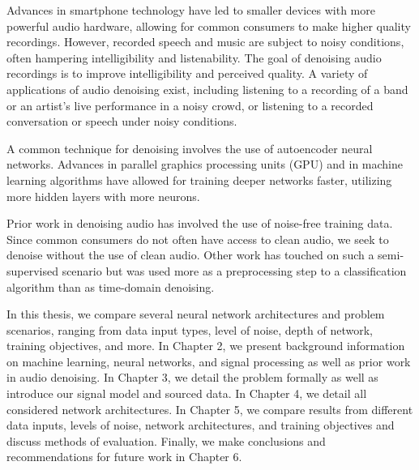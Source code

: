 Advances in smartphone technology have led to smaller devices with more powerful audio hardware, allowing for common consumers to make higher quality recordings. However, recorded speech and music are subject to noisy conditions, often hampering intelligibility and listenability. The goal of denoising audio recordings is to improve intelligibility and perceived quality. A variety of applications of audio denoising exist, including listening to a recording of a band or an artist's live performance in a noisy crowd, or listening to a recorded conversation or speech under noisy conditions.

A common technique for denoising involves the use of autoencoder neural networks. \cite{liu2014experiments} Advances in parallel graphics processing units (GPU) and in machine learning algorithms have allowed for training deeper networks faster, utilizing more hidden layers with more neurons.

Prior work in denoising audio has involved the use of noise-free training data. Since common consumers do not often have access to clean audio, we seek to denoise without the use of clean audio. Other work has touched on such a semi-supervised scenario but was used more as a preprocessing step to a classification algorithm than as time-domain denoising. \cite{stow}

In this thesis, we compare several neural network architectures and problem scenarios, ranging from data input types, level of noise, depth of network, training objectives, and more. In Chapter 2, we present background information on machine learning, neural networks, and signal processing as well as prior work in audio denoising. In Chapter 3, we detail the problem formally as well as introduce our signal model and sourced data. In Chapter 4, we detail all considered network architectures. In Chapter 5, we compare results from different data inputs, levels of noise, network architectures, and training objectives and discuss methods of evaluation. Finally, we make conclusions and recommendations for future work in Chapter 6.
